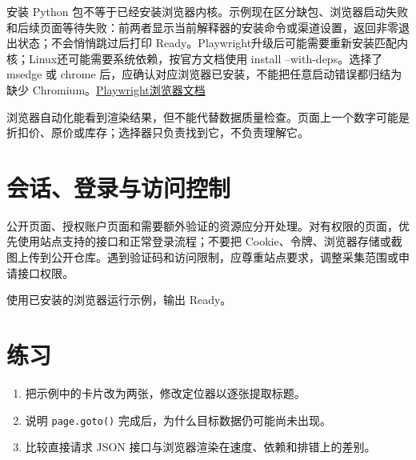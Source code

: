 \begin{warning}
安装 Python 包不等于已经安装浏览器内核。示例现在区分缺包、浏览器启动失败和后续页面等待失败：前两者显示当前解释器的安装命令或渠道设置，返回非零退出状态；不会悄悄跳过后打印 Ready。Playwright升级后可能需要重新安装匹配内核；Linux还可能需要系统依赖，按官方文档使用 install --with-deps。选择了 msedge 或 chrome 后，应确认对应浏览器已安装，不能把任意启动错误都归结为缺少 Chromium。\href{https://playwright.dev/python/docs/browsers}{Playwright浏览器文档}
\end{warning}

\begin{warning}
浏览器自动化能看到渲染结果，但不能代替数据质量检查。页面上一个数字可能是折扣价、原价或库存；选择器只负责找到它，不负责理解它。
\end{warning}

\section{会话、登录与访问控制}
公开页面、授权账户页面和需要额外验证的资源应分开处理。对有权限的页面，优先使用站点支持的接口和正常登录流程；不要把 Cookie、令牌、浏览器存储或截图上传到公开仓库。遇到验证码和访问限制，应尊重站点要求，调整采集范围或申请接口权限。

\begin{tcolorbox}[title=本章验收,colframe=Teal,colback=Teal!3]
使用已安装的浏览器运行示例，输出 Ready。
\end{tcolorbox}

\section{练习}
\begin{enumerate}[label=\arabic*.]
\item 把示例中的卡片改为两张，修改定位器以逐张提取标题。
\item 说明 \texttt{page.goto()} 完成后，为什么目标数据仍可能尚未出现。
\item 比较直接请求 JSON 接口与浏览器渲染在速度、依赖和排错上的差别。
\end{enumerate}


